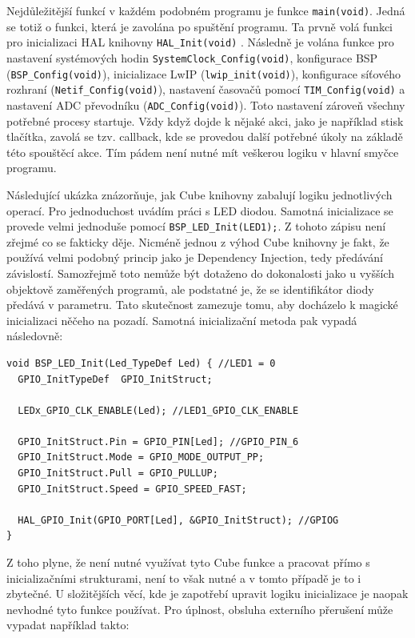 Nejdůležitější funkcí v každém podobném programu je funkce \texttt{main(void)}. Jedná se totiž o funkci, která je zavolána po spuštění programu. Ta prvně volá funkci pro inicializaci HAL knihovny \texttt{HAL\_Init(void)} \cite{hal}. Následně je volána funkce pro nastavení systémových hodin \texttt{SystemClock\_Config(void)}, konfigurace BSP (\texttt{BSP\_Config(void)}), inicializace LwIP  (\texttt{lwip\_init(void)}), konfigurace síťového rozhraní (\texttt{Netif\_Config(void)}), nastavení časovačů pomocí \texttt{TIM\_Config(void)} a nastavení ADC převodníku (\texttt{ADC\_Config(void)}). Toto nastavení zároveň všechny potřebné procesy startuje. Vždy když dojde k nějaké akci, jako je například stisk tlačítka, zavolá se tzv. callback, kde se provedou další potřebné úkoly na základě této spouštěcí akce. Tím pádem není nutné mít veškerou logiku v hlavní smyčce programu.

Následující ukázka znázorňuje, jak Cube knihovny  zabalují logiku jednotlivých operací. Pro jednoduchost uvádím práci s LED diodou. Samotná inicializace se provede velmi jednoduše pomocí \texttt{BSP\_LED\_Init(LED1);}. Z tohoto zápisu není zřejmé co se fakticky děje. Nicméně jednou z výhod Cube knihovny je fakt, že používá velmi podobný princip jako je Dependency Injection, tedy předávání závislostí. Samozřejmě toto nemůže být dotaženo do dokonalosti jako u vyšších objektově zaměřených programů, ale podstatné je, že se identifikátor diody předává v parametru. Tato skutečnost zamezuje tomu, aby docházelo k magické inicializaci něčeho na pozadí. Samotná inicializační metoda pak vypadá následovně:

\begin{verbatim}
void BSP_LED_Init(Led_TypeDef Led) { //LED1 = 0
  GPIO_InitTypeDef  GPIO_InitStruct;

  LEDx_GPIO_CLK_ENABLE(Led); //LED1_GPIO_CLK_ENABLE

  GPIO_InitStruct.Pin = GPIO_PIN[Led]; //GPIO_PIN_6
  GPIO_InitStruct.Mode = GPIO_MODE_OUTPUT_PP;
  GPIO_InitStruct.Pull = GPIO_PULLUP;
  GPIO_InitStruct.Speed = GPIO_SPEED_FAST;
  
  HAL_GPIO_Init(GPIO_PORT[Led], &GPIO_InitStruct); //GPIOG
}
\end{verbatim}

Z toho plyne, že není nutné využívat tyto Cube funkce a pracovat přímo s inicializačními strukturami, není to však nutné a v tomto případě je to i zbytečné. U složitějších věcí, kde je zapotřebí upravit logiku inicializace je naopak nevhodné tyto funkce používat. Pro úplnost, obsluha externího přerušení může vypadat například takto:

